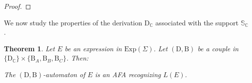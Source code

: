 \documentclass{article}
\newtheorem{theorem}{Theorem}
\begin{document}
\begin{proof}
      
      
\end{proof}
 
    
    
    
     We now study the properties of the derivation $\mathrm{D}_\mathbb{C}$ associated with the support $\mathbb{S}_\mathbb{C}$.
     
    
    \begin{theorem}\label{thm db afa le}
      Let $E$ be an expression in $\mathrm{Exp}(\Sigma)$. Let $(\mathrm{D},\mathrm{B})$ be a couple in $\{\mathrm{D}_{\mathbb{C}}\}\times\{\mathrm{B}_A,\mathrm{B}_B,\mathrm{B}_C\}$. Then:
      
      \centerline{
        The $(\mathrm{D},\mathrm{B})$-automaton of $E$ is an AFA recognizing $L(E)$.
      }
    \end{theorem}
\end{document}
